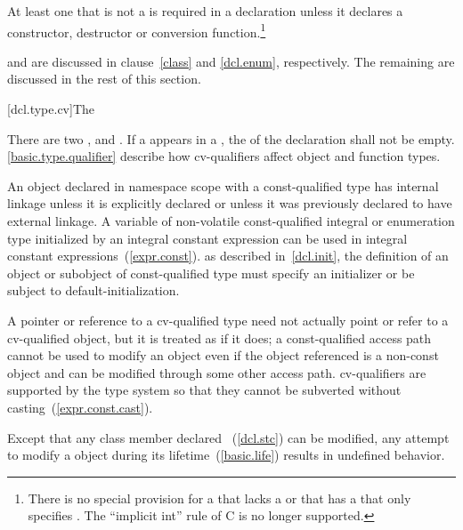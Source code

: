 \pnum
At least one  that is not a
 is required in a declaration unless it declares
a constructor, destructor or conversion function.\footnote{There is no special
provision for a  that
lacks a  or that has a
 that only specifies .
The ``implicit int'' rule of C is no longer supported.}

\pnum
\enternote
{} and  are
discussed in clause~\ref{class} and \ref{dcl.enum}, respectively. The remaining
 are discussed in the rest of this section.
\exitnote

[dcl.type.cv]{The }%
%
%
%

\pnum
There are two ,  and
. If a  appears in a
, the  of
the declaration shall not be empty.
\enternote
\ref{basic.type.qualifier} describe how cv-qualifiers affect object and
function types.
\exitnote

\pnum
An object declared in namespace scope with a const-qualified type has
internal linkage unless it is explicitly declared  or
unless it was previously declared to have external linkage. A variable of
non-volatile const-qualified integral or enumeration type initialized by
an integral constant expression can be used in integral constant
expressions~(\ref{expr.const}).
\enternote
as described in~\ref{dcl.init}, the definition of an object or subobject
of const-qualified type must specify an initializer or be subject to
default-initialization.
\exitnote

\pnum
A pointer or reference to a cv-qualified type need not actually point or
refer to a cv-qualified object, but it is treated as if it does; a
const-qualified access path cannot be used to modify an object even if
the object referenced is a non-const object and can be modified through
some other access path.
\enternote
cv-qualifiers are supported by the type system so that they cannot be
subverted without casting~(\ref{expr.const.cast}).
\exitnote

\pnum
{}%
Except that any class member declared ~(\ref{dcl.stc})
can be modified, any attempt to modify a  object during its
lifetime~(\ref{basic.life}) results in undefined behavior.

